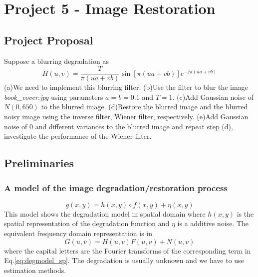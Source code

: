 \section{Project 5 - Image Restoration}
\subsection{Project Proposal}
Suppose a blurring degradation as \begin{equation} H(u,v)=\frac{T}{\pi(ua+vb)}\sin[\pi(ua+vb)]e^{-j\pi(ua+vb)} \end{equation} (a)We need to implement this blurring filter. (b)Use the filter to blur the image \emph{book\_cover.jpg} using parameters $a=b=0.1$ and $T=1$. (c)Add Gaussian noise of $N(0, 650)$ to the blurred image. (d)Restore the blurred image and the blurred noisy image using the inverse filter, Wiener filter, respectively. (e)Add Gaussian noise of 0 and different variances to the blurred image and repeat step (d), investigate the performance of the Wiener filter.

\subsection{Preliminaries}
\subsubsection{A model of the image degradation/restoration process}
\begin{equation} g(x,y)=h(x,y)\circ f(x,y)+\eta(x,y) \label{eq:degmodel_sp}\end{equation}This model shows the degradation model in spatial domain where $h(x,y)$ is the spatial representation of the degradation function and $\eta$ is a additive noise. The equivalent frequency domain representation is in \begin{equation} \label{eq:degmodel_fr} G(u,v)=H(u,v)F(u,v)+N(u,v) \end{equation} where the capital letters are the Fourier transforms of the corresponding term in Eq.\ref{eq:degmodel_sp}. The degradation is usually unknown and we have to use estimation methods. 
